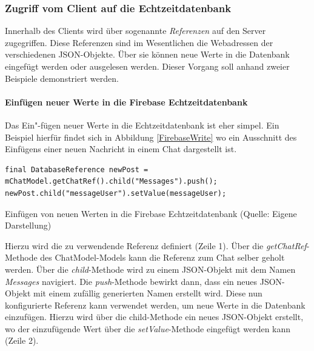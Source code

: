 \documentclass[../main.tex]{subfiles}
\begin{document}
	\subsubsection{Zugriff vom Client auf die Echtzeitdatenbank}
	Innerhalb des Clients wird über sogenannte \emph{Referenzen} auf den Server zugegriffen. Diese Referenzen sind im Wesentlichen die Webadressen der verschiedenen JSON-Objekte. Über sie können neue Werte in die Datenbank eingefügt werden oder ausgelesen werden. Dieser Vorgang soll anhand zweier Beispiele demonstriert werden.
	
	\paragraph{Einfügen neuer Werte in die Firebase Echtzeitdatenbank}
	Das Ein"-fügen neuer Werte in die Echtzeitdatenbank ist eher simpel. Ein Beispiel hierfür findet sich in Abbildung \ref{FirebaseWrite} wo ein Ausschnitt des Einfügens einer neuen Nachricht in einem Chat dargestellt ist.

\begin{code}
	\begin{center}
		\begin{verbatim}
final DatabaseReference newPost = mChatModel.getChatRef().child("Messages").push();
newPost.child("messageUser").setValue(messageUser);
		\end{verbatim}
		\caption{Einfügen von neuen Werten in die Firebase Echtzeitdatenbank (Quelle: Eigene Darstellung)}
		\label{FirebaseWrite}
	\end{center}
\end{code}
	
	Hierzu wird die zu verwendende Referenz definiert (Zeile 1). Über die \emph{getChatRef}-Methode des ChatModel-Models kann die Referenz zum Chat selber geholt werden. Über die \emph{child}-Methode wird zu einem JSON-Objekt mit dem Namen \emph{Messages} navigiert. Die \emph{push}-Methode bewirkt dann, dass ein neues JSON-Objekt mit einem zufällig generierten Namen erstellt wird. Diese nun konfigurierte Referenz kann verwendet werden, um neue Werte in die Datenbank einzufügen. Hierzu wird über die child-Methode ein neues JSON-Objekt erstellt, wo der einzufügende Wert über die \emph{setValue}-Methode eingefügt werden kann (Zeile 2). %
	
\end{document}
